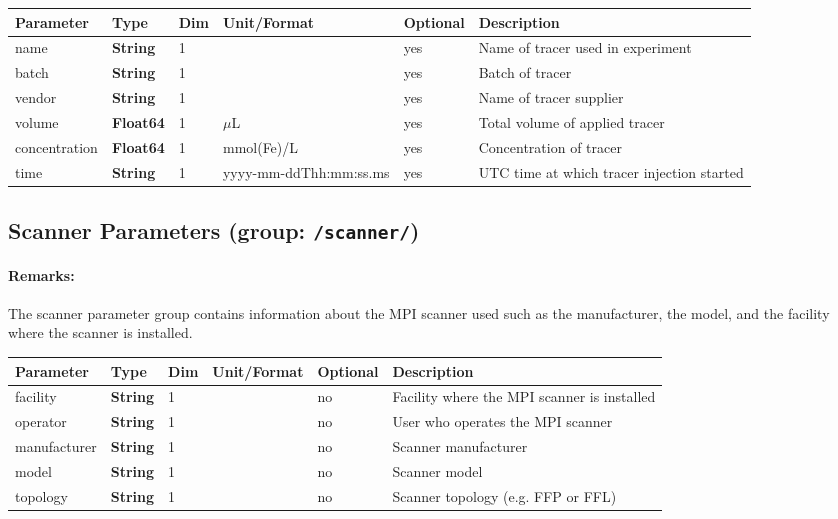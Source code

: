 \documentclass[landscape]{article} %
\newcommand{\inl}[1]{\lstinline[columns=fixed]{#1}}
\newcommand{\inltab}[1]{{\ttfamily\bfseries\color{blue}#1}}
\newcommand{\inlvar}[1]{{\ttfamily#1}}
\begin{document}
\noindent \begin{tabularx}{\columnwidth}{lllllX} 
\textbf{Parameter} & \textbf{Type} & \textbf{Dim} & \textbf{Unit/Format} & \textbf{Optional} & \textbf{Description} \\ \hline 
\inlvar{name} & \inltab{String} & 1 &  & yes & Name of tracer used in experiment \\ \hline
\inlvar{batch} & \inltab{String} & 1 & & yes & Batch of tracer \\ \hline
\inlvar{vendor} & \inltab{String} & 1 & & yes & Name of tracer supplier \\ \hline
\inlvar{volume} & \inltab{Float64} & 1 & $\mu$L & yes & Total volume of applied tracer \\ \hline
\inlvar{concentration} & \inltab{Float64} & 1 & mmol(Fe)/L & yes & Concentration of tracer \\ \hline
\inlvar{time} & \inltab{String} & 1 & yyyy-mm-ddThh:mm:ss.ms & yes & UTC time at which tracer injection started \\ \hline
\end{tabularx}

\newpage
\subsection{Scanner Parameters (group: \inl{/scanner/})}

\begin{multicols}{2}

\paragraph{Remarks:} The scanner parameter group contains information about the MPI scanner used such as the manufacturer, the model, and the facility where the scanner is installed.

\end{multicols}


\noindent \begin{tabularx}{\columnwidth}{lllllX}
\noindent \textbf{Parameter} & \textbf{Type} & \textbf{Dim} & \textbf{Unit/Format} & \textbf{Optional} & \textbf{Description} \\ \hline 
\inlvar{facility} & \inltab{String} & 1 & & no & Facility where the MPI scanner is installed \\ \hline 
\inlvar{operator} & \inltab{String} & 1 & & no & User who operates the MPI scanner \\ \hline 
\inlvar{manufacturer} & \inltab{String} & 1 & & no & Scanner manufacturer \\ \hline 
\inlvar{model} & \inltab{String} & 1 & & no & Scanner model \\ \hline 
\inlvar{topology} & \inltab{String} & 1 & & no & Scanner topology (e.g. FFP or FFL)\\ \hline 
\end{tabularx}
\end{document}
